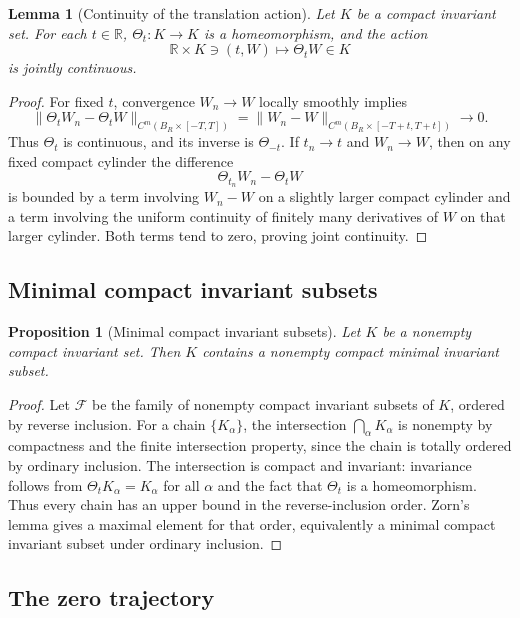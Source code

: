 \documentclass[11pt]{amsart}
\theoremstyle{plain}
\newtheorem{proposition}[theorem]{Proposition}
\newtheorem{lemma}[theorem]{Lemma}
\theoremstyle{definition}
\theoremstyle{remark}
\numberwithin{equation}{section}
\newcommand{\R}{\mathbb R}
\begin{document}
\begin{lemma}[Continuity of the translation action]\label{lem:action-continuity}
Let \(K\) be a compact invariant set.  For each \(t\in\R\),
\(\Theta_t:K\to K\) is a homeomorphism, and the action
\[
   \R\times K\ni(t,W)\mapsto \Theta_tW\in K
\]
is jointly continuous.
\end{lemma}

\begin{proof}
For fixed \(t\), convergence \(W_n\to W\) locally smoothly implies
\[
   \|\Theta_tW_n-\Theta_tW\|_{C^m(B_R\times[-T,T])}
   =
   \|W_n-W\|_{C^m(B_R\times[-T+t,T+t])}\to0.
\]
Thus \(\Theta_t\) is continuous, and its inverse is \(\Theta_{-t}\).  If
\(t_n\to t\) and \(W_n\to W\), then on any fixed compact cylinder the
difference
\[
   \Theta_{t_n}W_n-\Theta_tW
\]
is bounded by a term involving \(W_n-W\) on a slightly larger compact cylinder
and a term involving the uniform continuity of finitely many derivatives of
\(W\) on that larger cylinder.  Both terms tend to zero, proving joint
continuity.
\end{proof}

\subsection{Minimal compact invariant subsets}

\begin{proposition}[Minimal compact invariant subsets]\label{prop:minimal-subset}
Let \(K\) be a nonempty compact invariant set.  Then \(K\) contains a
nonempty compact minimal invariant subset.
\end{proposition}

\begin{proof}
Let \(\mathcal F\) be the family of nonempty compact invariant subsets of
\(K\), ordered by reverse inclusion.  For a chain \(\{K_\alpha\}\), the
intersection \(\bigcap_\alpha K_\alpha\) is nonempty by compactness and the
finite intersection property, since the chain is totally ordered by ordinary
inclusion.  The intersection is compact and invariant: invariance follows
from \(\Theta_tK_\alpha=K_\alpha\) for all \(\alpha\) and the fact that
\(\Theta_t\) is a homeomorphism.  Thus every chain has an upper bound in the
reverse-inclusion order.  Zorn's lemma gives a maximal element for that order,
equivalently a minimal compact invariant subset under ordinary inclusion.
\end{proof}

\subsection{The zero trajectory}
\end{document}
